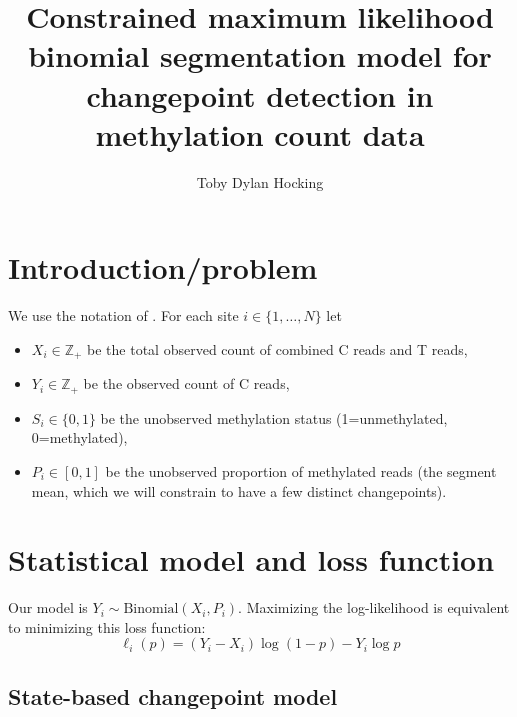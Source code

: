 \documentclass[12pt]{article}
\newcommand{\ZZ}{\mathbb Z}
\begin{document}
\title{Constrained maximum likelihood binomial segmentation model for
  changepoint detection in methylation count data}

\author{Toby Dylan Hocking}

\maketitle

\section{Introduction/problem}

We use the notation of \citet{smoothedEM}. For each site $i\in\{1,\dots, N\}$ let 
\begin{itemize}
\item $X_i\in\ZZ_+$ be the total observed count of combined C reads and T reads,
\item $Y_i\in\ZZ_+$ be the observed count of C reads,
\item $S_i\in\{0,1\}$ be the unobserved methylation status (1=unmethylated, 0=methylated),
\item $P_i\in[0,1]$ be the unobserved proportion of methylated reads
  (the segment mean, which we will constrain to have a few distinct changepoints).
\end{itemize}

\section{Statistical model and loss function}

Our model is $Y_i \sim \text{Binomial}(X_i, P_i)$. Maximizing the
log-likelihood is equivalent to minimizing this loss function:
\begin{equation}
  \label{eq:binomial_loss}
  \ell_i(p) = (Y_i - X_i) \log(1-p) - Y_i\log p
\end{equation}

\subsection{State-based changepoint model}
\end{document}
